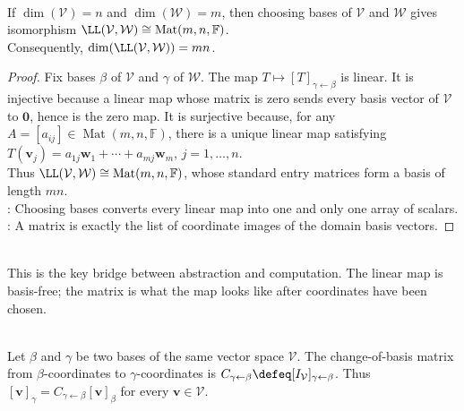 \begin{theorem} \label{thm:linear-maps-and-matrices-same-data} \\
If $\dim(\mathcal{V}) = n$ and $\dim(\mathcal{W}) = m$, then choosing bases of $\mathcal{V}$ and $\mathcal{W}$ gives isomorphism $\LL(\mathcal{V}, \mathcal{W}) \cong \operatorname{Mat}(m,n,\mathbb{F})$.\\
Consequently, $\dim(\LL(\mathcal{V}, \mathcal{W})) = mn$.
\begin{proof}
Fix bases $\beta$ of $\mathcal{V}$ and $\gamma$ of $\mathcal{W}$. The map $T\mapsto [T]_{\gamma \leftarrow \beta}$ is linear. It is injective because a linear map whose matrix is zero sends every basis vector of $\mathcal{V}$ to $\mathbf{0}$, hence is the zero map. It is surjective because, for any $A=[a_{ij}]\in\operatorname{Mat}(m,n,\mathbb{F})$, there is a unique linear map satisfying $T(\mathbf{v}_j)=a_{1j}\mathbf{w}_1+\cdots+a_{mj}\mathbf{w}_m$, $j=1,\ldots,n$.\\
Thus $\LL(\mathcal{V},\mathcal{W})\cong\operatorname{Mat}(m,n,\mathbb{F})$, whose standard entry matrices form a basis of length $mn$.\\
: Choosing bases converts every linear map into one and only one array of scalars.\\
: A matrix is exactly the list of coordinate images of the domain basis vectors.
\end{proof}
\end{theorem}

\begin{motivation} \\
This is the key bridge between abstraction and computation. The linear map is basis-free; the matrix is what the map looks like after coordinates have been chosen.
\end{motivation}

\begin{definition} \\
Let $\beta$ and $\gamma$ be two bases of the same vector space $\mathcal{V}$. The change-of-basis matrix from $\beta$-coordinates to $\gamma$-coordinates is $C_{\gamma \leftarrow \beta} \defeq [I_{\mathcal{V}}]_{\gamma \leftarrow \beta}$. Thus $[\mathbf{v}]_{\gamma} = C_{\gamma \leftarrow \beta}[\mathbf{v}]_{\beta}$ for every $\mathbf{v} \in \mathcal{V}$.
\end{definition}

